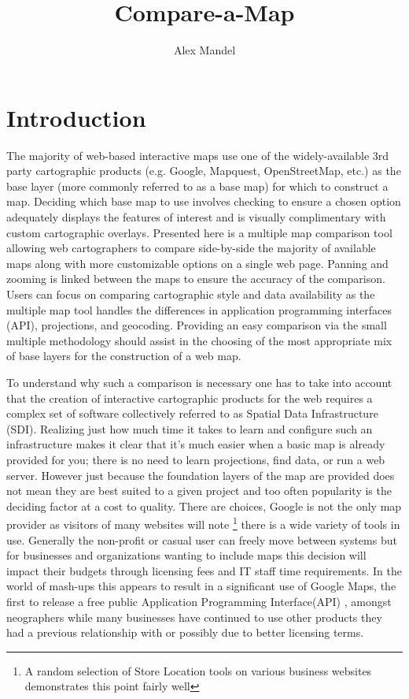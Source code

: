 \documentclass[12pt,letterpaper]{article}
\title{Compare-a-Map}
\author{Alex Mandel}
\begin{document}
\maketitle
\tableofcontents

\section{Introduction}
The majority of web-based interactive maps use one of the widely-available 3rd party cartographic products (e.g. Google, Mapquest, OpenStreetMap, etc.) as the base layer (more commonly referred to as a base map) for which to construct a map. Deciding which base map to use involves checking to ensure a chosen option adequately displays the features of interest and is visually complimentary with custom cartographic overlays.  Presented here is a multiple map comparison tool allowing web cartographers to compare side-by-side the majority of available maps along with more customizable options on a single web page. Panning and zooming is linked between the maps to ensure the accuracy of the comparison. Users can focus on comparing cartographic style and data availability as the multiple map tool handles the differences in application programming interfaces (API), projections, and geocoding.  Providing an easy comparison via the small multiple methodology should assist in the choosing \parencite{Tufte1990} of the most appropriate mix of base layers for the construction of a web map.

	To understand why such a comparison is necessary one has to take into account that the creation of interactive cartographic products for the web requires a complex set of software collectively referred to as Spatial Data Infrastructure (SDI). Realizing just how much time it takes to learn and configure such an infrastructure makes it clear that it's much easier when a basic map is already provided for you; there is no need to learn projections, find data, or run a web server. However just because the foundation layers of the map are provided does not mean they are best suited to a given project and too often popularity is the deciding factor at a cost to quality. There are choices, Google is not the only map provider as visitors of many websites will note \footnote{A random selection of Store Location tools on various business websites demonstrates this point fairly well} there is a wide variety of tools in use. Generally the non-profit or casual user can freely move between systems but for businesses and organizations wanting to include maps this decision will impact their budgets through  licensing fees and IT staff time requirements. In the world of mash-ups this appears to result in a significant use of Google Maps, the first to release a free public Application Programming Interface(API) \parencite{Turner2006}, amongst neographers while many businesses have continued to use other products they had a previous relationship with or possibly due to better licensing terms.
	  
\end{document}
